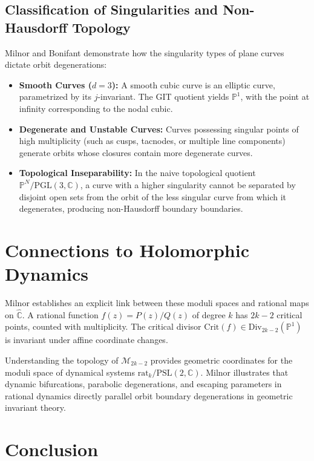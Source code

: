 \documentclass[11pt,a4paper]{article}
\begin{document}
\subsection{Classification of Singularities and Non-Hausdorff Topology}
Milnor and Bonifant demonstrate how the singularity types of plane curves dictate orbit degenerations:
\begin{itemize}
    \item \textbf{Smooth Curves ($d = 3$):} A smooth cubic curve is an elliptic curve, parametrized by its $j$-invariant. The GIT quotient yields $\mathbb{P}^1$, with the point at infinity corresponding to the nodal cubic.
    \item \textbf{Degenerate and Unstable Curves:} Curves possessing singular points of high multiplicity (such as cusps, tacnodes, or multiple line components) generate orbits whose closures contain more degenerate curves.
    \item \textbf{Topological Inseparability:} In the naive topological quotient $\mathbb{P}^N / \mathrm{PGL}(3, \mathbb{C})$, a curve with a higher singularity cannot be separated by disjoint open sets from the orbit of the less singular curve from which it degenerates, producing non-Hausdorff boundary boundaries.
\end{itemize}

\section{Connections to Holomorphic Dynamics}

Milnor establishes an explicit link between these moduli spaces and rational maps on $\widehat{\mathbb{C}}$. A rational function $f(z) = P(z)/Q(z)$ of degree $k$ has $2k - 2$ critical points, counted with multiplicity. The critical divisor $\mathrm{Crit}(f) \in \mathrm{Div}_{2k-2}(\mathbb{P}^1)$ is invariant under affine coordinate changes.

Understanding the topology of $\mathcal{M}_{2k-2}$ provides geometric coordinates for the moduli space of dynamical systems $\mathrm{rat}_k / \mathrm{PSL}(2, \mathbb{C})$. Milnor illustrates that dynamic bifurcations, parabolic degenerations, and escaping parameters in rational dynamics directly parallel orbit boundary degenerations in geometric invariant theory.

\section{Conclusion}
\end{document}
